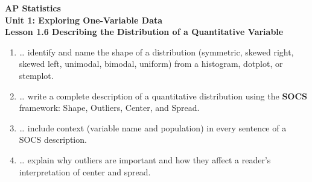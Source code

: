 \documentclass[10pt]{article}
\begin{document}
\vspace{-0.8in}

\begin{center}
  {\color{white}\textbf{\LARGE AP Statistics}}\\[4pt]
  {\color{skymid}\large\textbf{Unit 1: Exploring One-Variable Data}}\\[6pt]
  {\color{white}\textbf{\large Lesson 1.6 \quad Describing the Distribution of a Quantitative Variable}}
\end{center}

\vspace{0.22in}

\namedateperiod

\vspace{0.18in}

\begin{learningtargetbox}
\small
\begin{enumerate}[leftmargin=1.5em, itemsep=5pt]
  \item \ldots{} identify and name the shape of a distribution (symmetric,
        skewed right, skewed left, unimodal, bimodal, uniform) from a histogram,
        dotplot, or stemplot.
  \item \ldots{} write a complete description of a quantitative distribution
        using the \textbf{SOCS} framework: Shape, Outliers, Center, and Spread.
  \item \ldots{} include context (variable name and population) in every sentence
        of a SOCS description.
  \item \ldots{} explain why outliers are important and how they affect a
        reader's interpretation of center and spread.
\end{enumerate}
\end{learningtargetbox}

\vspace{0.14in}
\end{document}
